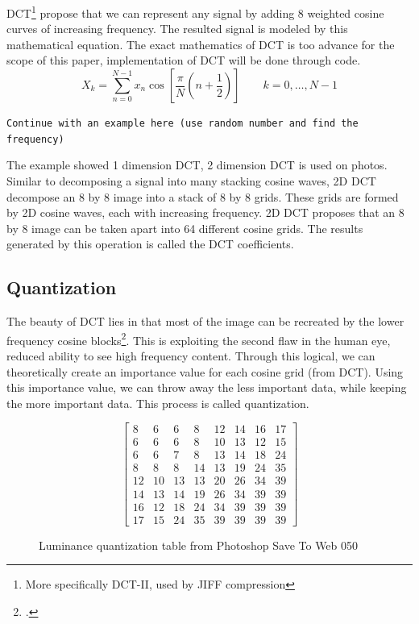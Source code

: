 \documentclass{article}
\begin{document}
DCT\footnote{More specifically DCT-II, used by JIFF compression} propose that we can represent any signal by adding 8 weighted cosine curves of increasing frequency.
The resulted signal is modeled by this mathematical equation.
The exact mathematics of DCT is too advance for the scope of this paper, implementation of DCT will be done through code.
\begin{equation}
	X_k = \sum_{n=0}^{N-1} x_n \cos \left [ \frac{\pi}{N} \left ( n + \frac{1}{2} \right ) \right ] \qquad k = 0, \dots , N - 1
\end{equation}


\texttt{Continue with an example here (use random number and find the frequency)}

The example showed 1 dimension DCT, 2 dimension DCT is used on photos.
Similar to decomposing a signal into many stacking cosine waves, 2D DCT decompose an 8 by 8 image into a stack of 8 by 8 grids.
These grids are formed by 2D cosine waves, each with increasing frequency.
2D DCT proposes that an 8 by 8 image can be taken apart into 64 different cosine grids.
The results generated by this operation is called the DCT coefficients.

\subsection{Quantization}\label{quantize}
The beauty of DCT lies in that most of the image can be recreated by the lower frequency cosine blocks\footcite{jpgYT}.
This is exploiting the second flaw in the human eye, reduced ability to see high frequency content.
Through this logical, we can theoretically create an importance value for each cosine grid (from DCT).
Using this importance value, we can throw away the less important data, while keeping the more important data.
This process is called quantization.

\begin{figure}[h]
\centering
\begin{equation}
	\begin{bmatrix}
		8  & 6  & 6  & 8  & 12 & 14 & 16 & 17 \\
		6  & 6  & 6  & 8  & 10 & 13 & 12 & 15 \\
		6  & 6  & 7  & 8  & 13 & 14 & 18 & 24 \\
		8  & 8  & 8  & 14 & 13 & 19 & 24 & 35 \\
		12 & 10 & 13 & 13 & 20 & 26 & 34 & 39 \\
		14 & 13 & 14 & 19 & 26 & 34 & 39 & 39 \\
		16 & 12 & 18 & 24 & 34 & 39 & 39 & 39 \\
		17 & 15 & 24 & 35 & 39 & 39 & 39 & 39
	\end{bmatrix}
\end{equation}
\label{fig:quantization}
\caption{Luminance quantization table from Photoshop Save To Web 050~\autocite{quantization}}
\end{figure}
\end{document}
